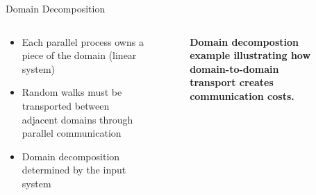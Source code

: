 \documentclass{beamer}
\begin{document}
\begin{frame}{Domain Decomposition}

  \begin{columns}
    \begin{column}{0.5\textwidth}
      \begin{itemize}
      \item Each parallel process owns a piece of the domain (linear
        system)
        \bigskip
      \item Random walks must be transported between adjacent domains
        through parallel communication
        \bigskip
      \item Domain decomposition determined by the input system
      \end{itemize}
    \end{column}

    \begin{column}{0.5\textwidth}
      \begin{figure}[htpb!]
        \begin{center}
          \scalebox{0.75}{  }
        \end{center}
        \caption{\textbf{Domain decompostion example illustrating how
            domain-to-domain transport creates communication costs.}}
      \end{figure}
    \end{column}
  \end{columns}

\end{frame}
\end{document}
